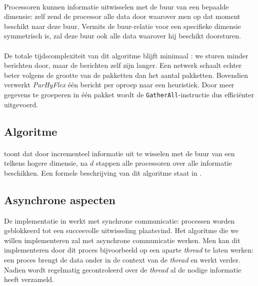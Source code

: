 \paragraph{}
Processoren kunnen informatie uitwisselen met de buur van een bepaalde dimensie: zelf zend de processor alle data door waarover men op dat moment beschikt naar deze buur. Vermits de buur-relatie voor een specifieke dimensie symmetrisch is, zal deze buur ook alle data waarover hij beschikt doorsturen.

\paragraph{}
De totale tijdscomplexiteit van dit algoritme blijft minimaal : we sturen minder berichten door, maar de berichten zelf zijn langer. Een netwerk schaalt echter beter volgens de grootte van de pakketten dan het aantal pakketten. Bovendien verwerkt \emph{ParHyFlex} \'e\'en bericht per oproep naar een heuristiek. Door meer gegevens te groeperen in \'e\'en pakket wordt de \texttt{GatherAll}-instructie dus effici\"enter uitgevoerd.

\subsection{Algoritme}

\paragraph{}
 toont dat door incrementeel informatie uit te wisselen met de buur van een telkens hogere dimensie, na $d$ stappen alle processoren over alle informatie beschikken. Een formele beschrijving van dit algoritme staat in .


\subsection{Asynchrone aspecten}

De implementatie in  werkt met synchrone communicatie: processen worden geblokkeerd tot een succesvolle uitwisseling plaatsvind. Het algoritme die we willen implementeren zal met asynchrone communicatie werken. Men kan dit implementeren door dit proces bijvoorbeeld op een aparte \emph{thread} te laten werken: een proces brengt de data onder in de context van de \emph{thread} en werkt verder. Nadien wordt regelmatig gecontroleerd over de \emph{thread} al de nodige informatie heeft verzameld.

